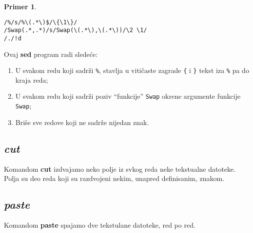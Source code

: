 \documentclass[12pt,a4paper,titlepage]{article}
\newtheorem{primer}{Primer}[section]
\begin{document}
      \begin{primer}\ \label{primer:sed}\end{primer}
      \begin{verbatim}
/%/s/%\(.*\)$/\{\1\}/
/Swap(.*,.*)/s/Swap(\(.*\),\(.*\))/\2 \1/
/./!d
\end{verbatim}

      Ovaj {\bf sed} program radi slede\'ce:
      \begin{enumerate}
      \item
        U svakom redu koji sadr\v zi {\tt\%}, stavlja u viti\v caste zagrade
        {\tt\{} i {\tt\}} tekst iza {\tt\%} pa do kraja reda;
      \item
        U svakom redu koji sadr\v zi poziv ``funkcije'' {\tt Swap} okrene
        argumente funkcije {\tt Swap};
      \item
        Bri\v se sve redove koji ne sadr\v ze nijedan znak.
      \end{enumerate}
%
    \subsection{\em cut}
      Komandom {\bf cut} izdvajamo neko polje iz svkog reda neke tekstualne
      datoteke.
      Polja su deo reda koji su razdvojeni nekim, unapred definisanim, znakom.
%
    \subsection{\em paste}
      Komandom {\bf paste} spajamo dve tekstulane datoteke, red po red.
%
\end{document}

